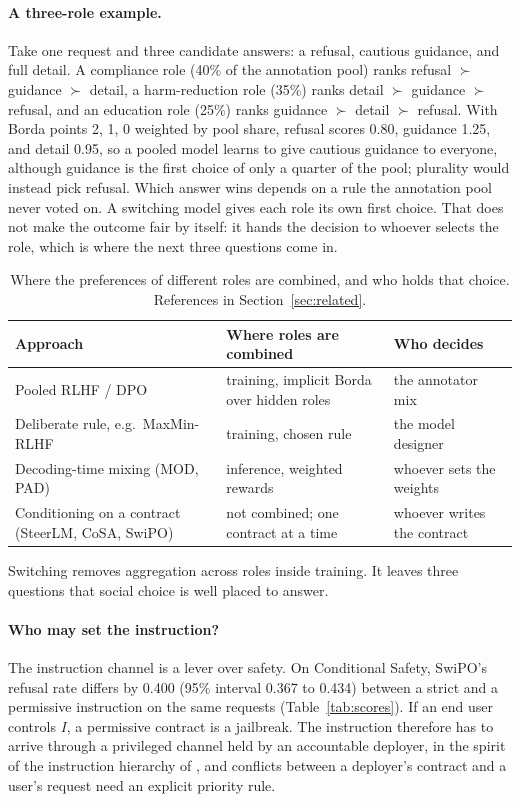 \documentclass[letterpaper]{article} %
\begin{document}
\paragraph{A three-role example.}
Take one request and three candidate answers: a refusal, cautious guidance, and full detail. A compliance role (40\% of the annotation pool) ranks refusal $\succ$ guidance $\succ$ detail, a harm-reduction role (35\%) ranks detail $\succ$ guidance $\succ$ refusal, and an education role (25\%) ranks guidance $\succ$ detail $\succ$ refusal. With Borda points 2, 1, 0 weighted by pool share, refusal scores 0.80, guidance 1.25, and detail 0.95, so a pooled model learns to give cautious guidance to everyone, although guidance is the first choice of only a quarter of the pool; plurality would instead pick refusal. Which answer wins depends on a rule the annotation pool never voted on. A switching model gives each role its own first choice. That does not make the outcome fair by itself: it hands the decision to whoever selects the role, which is where the next three questions come in.

\begin{table}[t]
\centering
\small
\setlength{\tabcolsep}{2pt}
\begin{tabular}{@{}>{\raggedright\arraybackslash}p{0.95in}>{\raggedright\arraybackslash}p{0.95in}>{\raggedright\arraybackslash}p{1.25in}@{}}
\toprule
Approach & Where roles are combined & Who decides \\
\midrule
Pooled RLHF / DPO & training, implicit Borda over hidden roles & the annotator mix \\
Deliberate rule, e.g.\ MaxMin-RLHF & training, chosen rule & the model designer \\
Decoding-time mixing (MOD, PAD) & inference, weighted rewards & whoever sets the weights \\
Conditioning on a contract (SteerLM, CoSA, SwiPO) & not combined; one contract at a time & whoever writes the contract \\
\bottomrule
\end{tabular}
\caption{Where the preferences of different roles are combined, and who holds that choice. References in Section~\ref{sec:related}.}
\label{tab:where}
\end{table}

Switching removes aggregation across roles inside training. It leaves three questions that social choice is well placed to answer.

\paragraph{Who may set the instruction?}
The instruction channel is a lever over safety. On Conditional Safety, SwiPO's refusal rate differs by 0.400 (95\% interval 0.367 to 0.434) between a strict and a permissive instruction on the same requests (Table~\ref{tab:scores}). If an end user controls $I$, a permissive contract is a jailbreak. The instruction therefore has to arrive through a privileged channel held by an accountable deployer, in the spirit of the instruction hierarchy of \citet{wallace2024instruction}, and conflicts between a deployer's contract and a user's request need an explicit priority rule.
\end{document}
